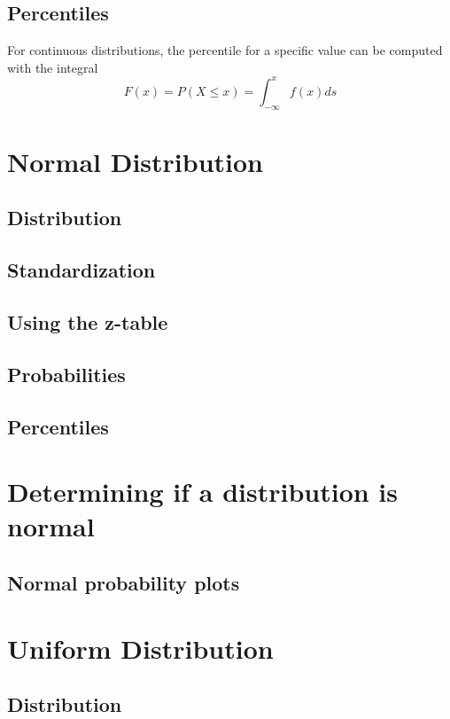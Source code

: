    \subsection{Percentiles}  %
        For continuous distributions, the percentile for a specific value can be computed with the integral
        \begin{equation}
            F(x)=P(X\leq x)=\int_{-\infty}^{x} f(x)ds
        \end{equation}

\section{Normal Distribution}  %
    \subsection{Distribution}  %
    \subsection{Standardization}  %
    \subsection{Using the z-table}  %
    \subsection{Probabilities}  %
    \subsection{Percentiles}  %

\section{Determining if a distribution is normal}  %
    \subsection{Normal probability plots}  %

\section{Uniform Distribution}  %
    \subsection{Distribution}  %

